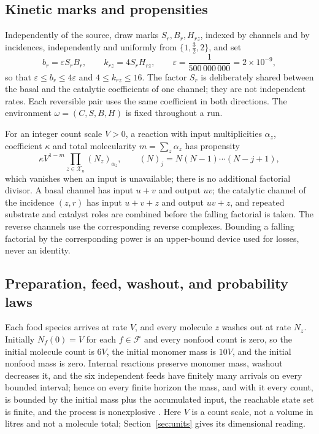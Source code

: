 \documentclass[11pt,letterpaper]{article}
\theoremstyle{plain}
\theoremstyle{definition}
\theoremstyle{remark}
\numberwithin{equation}{section}
\newcommand{\cX}{\mathcal X}
\newcommand{\cF}{\mathcal F}
\newcommand{\eps}{\varepsilon}
\begin{document}
\subsection{Kinetic marks and propensities}\label{sec:kinetics}
Independently of the source, draw marks $S_r,B_r,H_{rz}$, indexed by channels and by incidences, independently and uniformly from $\{1,\tfrac32,2\}$, and set
\begin{equation}\label{eq:marks}
 b_r=\eps S_rB_r,\qquad k_{rz}=4S_rH_{rz},\qquad \eps=\frac1{500\,000\,000}=2\times10^{-9},
\end{equation}
so that $\eps\le b_r\le4\eps$ and $4\le k_{rz}\le16$. The factor $S_r$ is deliberately shared between the basal and the catalytic coefficients of one channel; they are not independent rates. Each reversible pair uses the same coefficient in both directions. The environment $\omega=(C,S,B,H)$ is fixed throughout a run.

For an integer count scale $V>0$, a reaction with input multiplicities $\alpha_z$, coefficient $\kappa$ and total molecularity $m=\sum_z\alpha_z$ has propensity
\begin{equation}\label{eq:propensity}
 \kappa V^{1-m}\prod_{z\in\cX_n}(N_z)_{\alpha_z},\qquad (N)_j=N(N-1)\cdots(N-j+1),
\end{equation}
which vanishes when an input is unavailable; there is no additional factorial divisor. A basal channel has input $u+v$ and output $uv$; the catalytic channel of the incidence $(z,r)$ has input $u+v+z$ and output $uv+z$, and repeated substrate and catalyst roles are combined before the falling factorial is taken. The reverse channels use the corresponding reverse complexes. Bounding a falling factorial by the corresponding power is an upper-bound device used for losses, never an identity.

\subsection{Preparation, feed, washout, and probability laws}\label{sec:protocol}
Each food species arrives at rate $V$, and every molecule $z$ washes out at rate $N_z$. Initially $N_f(0)=V$ for each $f\in\cF$ and every nonfood count is zero, so the initial molecule count is $6V$, the initial monomer mass is $10V$, and the initial nonfood mass is zero. Internal reactions preserve monomer mass, washout decreases it, and the six independent feeds have finitely many arrivals on every bounded interval; hence on every finite horizon the mass, and with it every count, is bounded by the initial mass plus the accumulated input, the reachable state set is finite, and the process is nonexplosive \cite{anderson2011continuous,ethier1986markov}. Here $V$ is a count scale, not a volume in litres and not a molecule total; Section~\ref{sec:units} gives its dimensional reading.
\end{document}
